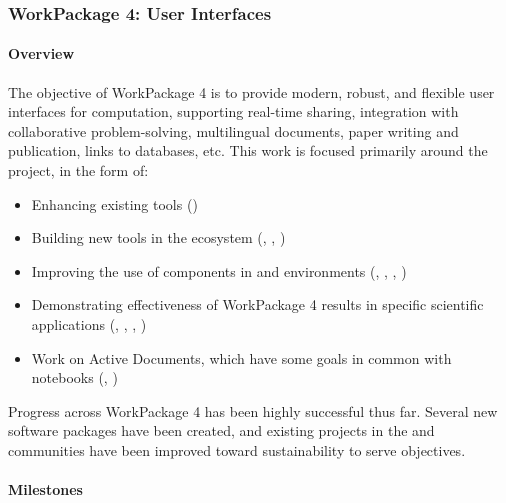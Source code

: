\subsubsection{WorkPackage 4: User Interfaces}

\paragraph{Overview}

The objective of WorkPackage 4 is to provide modern, robust, and flexible user interfaces for
computation, supporting real-time sharing, integration with collaborative problem-solving,
multilingual documents, paper writing and publication, links to databases, etc. This work is focused primarily around the \Jupyter project, in the form of:

\begin{itemize}
    \item Enhancing existing \Jupyter tools ()
    \item Building new tools in the \Jupyter ecosystem (, , )
    \item Improving the use of \ODK components in \Jupyter and \Sage environments (, , , )
    \item Demonstrating effectiveness of WorkPackage 4 results in specific scientific applications (, , , )
    \item Work on Active Documents, which have some goals in common with \Jupyter notebooks (, )
\end{itemize}

Progress across WorkPackage 4 has been highly successful thus far.
Several new software packages have been created,
and existing projects in the \Sage and \Jupyter communities have been improved toward sustainability to serve \ODK objectives.

\paragraph{Milestones}

